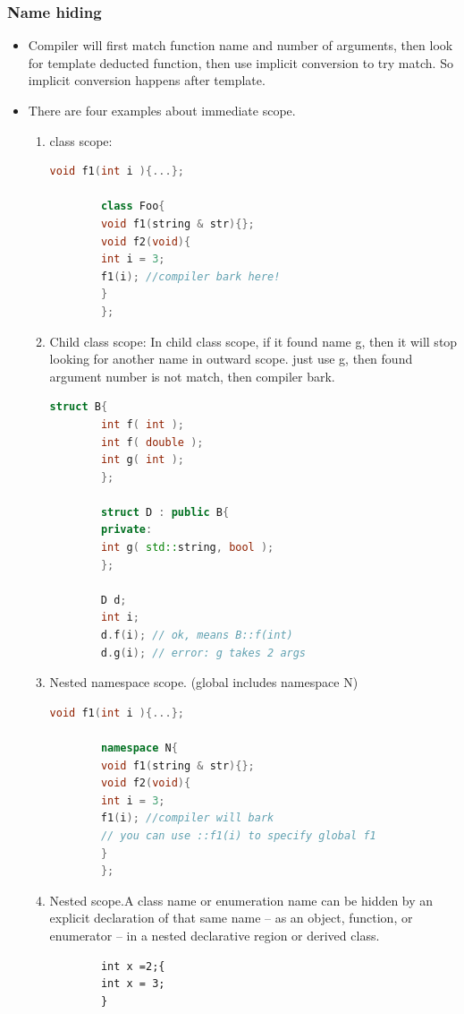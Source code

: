 \documentclass[a4paper,11pt,twoside]{book}
\begin{document}
\subsubsection{Name hiding}
\begin{itemize}
	
	\item Compiler will first match function name and number of arguments, then look for template deducted function, then use implicit conversion to try match. So implicit conversion happens after template.
	
	\item There are four examples about immediate scope.
	\begin{enumerate}
		\item class scope:
		\begin{lstlisting}[frame=single, language=c++]
		void f1(int i ){...};
		
		class Foo{
		void f1(string & str){};
		void f2(void){
		int i = 3;
		f1(i); //compiler bark here!
		}
		};
		\end{lstlisting}
		
		\item Child class scope: In child class scope, if it found name g, then it will stop looking for another name in outward scope. just use g, then found argument number is not match, then compiler bark.
		\begin{lstlisting}[frame=single, language=c++]
		struct B{
		int f( int );
		int f( double );
		int g( int );
		};
		
		struct D : public B{
		private:
		int g( std::string, bool );
		};
		
		D d;
		int i;
		d.f(i); // ok, means B::f(int)
		d.g(i); // error: g takes 2 args
		\end{lstlisting}
		
		\item Nested namespace scope. (global includes namespace N)
		\begin{lstlisting}[frame=single, language=c++]
		void f1(int i ){...};
		
		namespace N{
		void f1(string & str){};
		void f2(void){
		int i = 3;
		f1(i); //compiler will bark
		// you can use ::f1(i) to specify global f1
		}
		};
		\end{lstlisting}
		\item Nested scope.A class name or enumeration name can be hidden by an explicit declaration of that same name -- as an object, function, or enumerator -- in a nested declarative region or derived class.
		\begin{lstlisting}
		int x =2;{
		int x = 3;
		}
		\end{lstlisting}
		

\end{enumerate}
\end{itemize}
\end{document}
